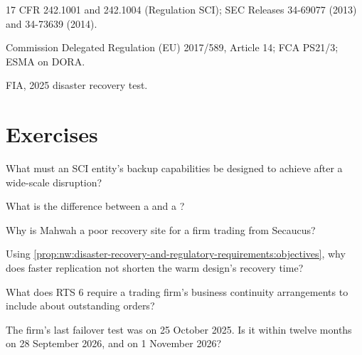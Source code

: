 \begin{omsources}
\item 17 CFR 242.1001 and 242.1004 (Regulation SCI); SEC Releases 34-69077 (2013) and 34-73639 (2014).
\item Commission Delegated Regulation (EU) 2017/589, Article 14; FCA PS21/3; ESMA on DORA.
\item FIA, 2025 disaster recovery test.
\end{omsources}

\section{Exercises}

\begin{exercise}[$\star$]\label{exo:nw:disaster-recovery-and-regulatory-requirements:1}
What must an SCI entity's backup capabilities be designed to achieve after a wide-scale disruption?
\end{exercise}

\begin{exercise}[$\star$]\label{exo:nw:disaster-recovery-and-regulatory-requirements:2}
What is the difference between a  and a ?
\end{exercise}

\begin{exercise}[$\star$]\label{exo:nw:disaster-recovery-and-regulatory-requirements:3}
Why is Mahwah a poor recovery site for a firm trading from Secaucus?
\end{exercise}

\begin{exercise}[$\star\star$]\label{exo:nw:disaster-recovery-and-regulatory-requirements:4}
Using \cref{prop:nw:disaster-recovery-and-regulatory-requirements:objectives}, why does faster replication not shorten the warm design's
recovery time?
\end{exercise}

\begin{exercise}[$\star\star$]\label{exo:nw:disaster-recovery-and-regulatory-requirements:5}
What does RTS 6 require a trading firm's business continuity arrangements to include about outstanding orders?
\end{exercise}

\begin{exercise}[$\star\star$]\label{exo:nw:disaster-recovery-and-regulatory-requirements:6}
The firm's last failover test was on 25 October 2025. Is it within twelve months on 28 September 2026, and on 1 November 2026?
\end{exercise}

